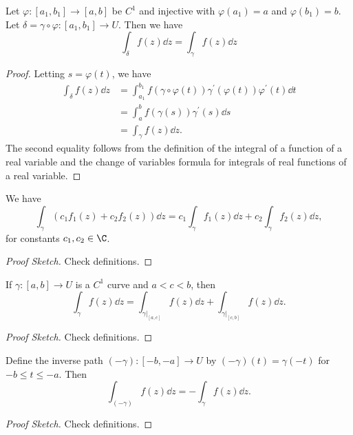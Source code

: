 \begin{proposition}
Let $\varphi:\left[a_{1}, b_{1}\right] \rightarrow[a, b]$ be $C^{1}$ and injective with $\varphi\left(a_{1}\right)=a$ and $\varphi\left(b_{1}\right)=b$. Let
$\delta=\gamma \circ \varphi:\left[a_{1}, b_{1}\right] \rightarrow U$. Then we have
$$
\int_{\delta} f(z) \dd z=\int_{\gamma} f(z) \dd z
$$
\end{proposition}
\begin{proof}
    Letting $s = \varphi(t)$, we have
    \begin{align*}
\int_{\delta} f(z) \dd z&=\int_{a_{1}}^{b_{1}} f(\gamma \circ \varphi(t)) \gamma^{\prime}(\varphi(t)) \varphi^{\prime}(t) \dd t \\
&= \int_{a}^{b} f(\gamma(s)) \gamma^{\prime}(s) \dd s \\ &=\int_{\gamma} f(z) \dd z.
    \end{align*}
    The second equality follows from the definition of the integral of a function of a real variable and the change of variables formula for integrals of real functions of a real variable.
\end{proof}

\begin{proposition}[Linearity]
    We have
    $$
    \int_{\gamma}\left(c_{1} f_{1}(z)+c_{2} f_{2}(z)\right) \dd z=c_{1} \int_{\gamma} f_{1}(z) \dd z+c_{2} \int_{\gamma} f_{2}(z) \dd z,
    $$
    for constants $c_1, c_2 \in \C$.
\end{proposition}
\begin{proof}[Proof Sketch]    
    Check definitions.
\end{proof}

\begin{proposition}[Additivity]
    If $\gamma:[a, b] \rightarrow U$ is a $C^{1}$ curve and $a<c<b$, then 
    $$\int_{\gamma} f(z) \dd z=\int_{\left.\gamma\right|_{[a, c]}} f(z) \dd z+\int_{\left.\gamma\right|_{[c, b]}} f(z) \dd z .
    $$
\end{proposition}
\begin{proof}[Proof Sketch]    
    Check definitions.
\end{proof}

\begin{proposition}
Define the inverse path $(-\gamma):[-b,-a] \rightarrow U$ by $(-\gamma)(t)=\gamma(-t)$ for $-b \leq t \leq-a$. Then
$$
\int_{(-\gamma)} f(z) \dd z=-\int_{\gamma} f(z) \dd z .
$$
\end{proposition}
\begin{proof}[Proof Sketch]    
    Check definitions.
\end{proof}

